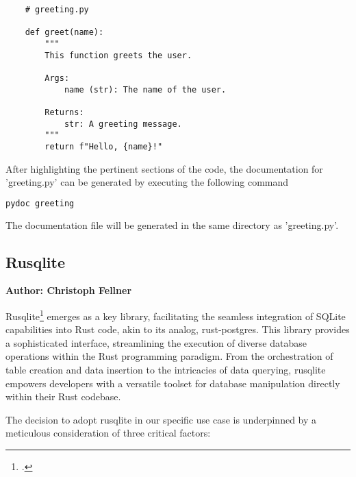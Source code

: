 \begin{minipage}
\begin{lstlisting} 
	# greeting.py
	 
	def greet(name):
    	"""
    	This function greets the user.
    
    	Args:
        	name (str): The name of the user.
        
    	Returns:
        	str: A greeting message.
    	"""
    	return f"Hello, {name}!"
\end{lstlisting}

After highlighting the pertinent sections of the code, the documentation for 'greeting.py' can be generated by executing the following command 

\begin{lstlisting}[language=bash]  
	pydoc greeting
\end{lstlisting}
\end{minipage}

The documentation file will be generated in the same directory as 'greeting.py'.


\subsection{Rusqlite}
\textbf{Author: Christoph Fellner}

Rusqlite\footcite{rusqlite} emerges as a key library, facilitating the seamless integration of SQLite capabilities into Rust code, akin to its analog, 
rust-postgres. This library provides a sophisticated interface, streamlining the execution of diverse database operations within the Rust programming paradigm. 
From the orchestration of table creation and data insertion to the intricacies of data querying, rusqlite empowers developers with a versatile toolset for 
database manipulation directly within their Rust codebase.

The decision to adopt rusqlite in our specific use case is underpinned by a meticulous consideration of three critical factors:

